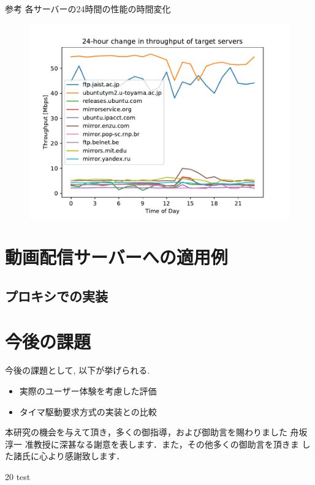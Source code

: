\documentclass[a4j,12pt]{gradthesis_utf8}
\begin{document}
参考 各サーバーの24時間の性能の時間変化
\begin{figure}
	\begin{center}
		\includegraphics[width=15cm]{thp24h.pdf}
	\end{center}
\end{figure}


\chapter{動画配信サーバーへの適用例}
\section{プロキシでの実装}
 
\chapter{今後の課題}\label{sec:sec7}
\hspace*{0.5em}今後の課題として, 以下が挙げられる.
\begin{itemize}
	\item 実際のユーザー体験を考慮した評価
	\item タイマ駆動要求方式の実装との比較
\end{itemize}
\clearpage
%
\begin{acknowledgment}
 本研究の機会を与えて頂き，多くの御指導，および御助言を賜わりました
舟坂 淳一 准教授に深甚なる謝意を表します．また，その他多くの御助言を頂きま
した諸氏に心より感謝致します．
\end{acknowledgment}
\begin {thebibliography}{20} 
 test

\end {thebibliography}
\end{document}
